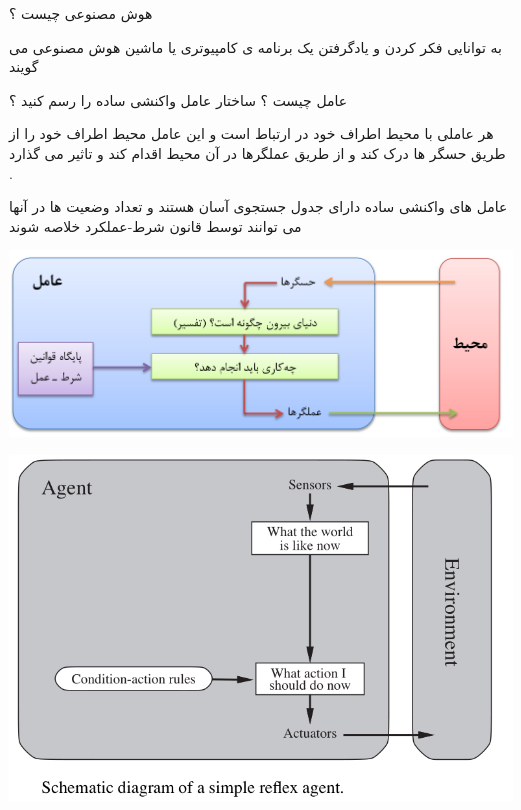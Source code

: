 \documentclass[12pt]{article}
\begin{document}
\noindent
هوش مصنوعی
 چیست ؟

\vspace{10pt}


\begin{tcolorbox}
به توانایی فکر کردن و یادگرفتن یک برنامه ی کامپیوتری یا ماشین  هوش مصنوعی می گویند 
\end{tcolorbox}

\vspace{30pt}

\noindent
عامل
 چیست ؟ ساختار عامل واکنشی ساده را رسم کنید ؟

\vspace{10pt}

\begin{tcolorbox}
هر عاملی با محیط اطراف خود در ارتباط است و این عامل محیط  اطراف خود را از طریق حسگر ها درک کند و از طریق عملگرها در آن محیط اقدام کند و تاثیر می گذارد .
\end{tcolorbox}


\begin{tcolorbox}
عامل های واکنشی ساده دارای جدول جستجوی آسان هستند و تعداد وضعیت ها در آنها می توانند توسط قانون شرط-عملکرد خلاصه شوند 
\end{tcolorbox}

\begin{center}
	\includegraphics[scale=0.6]{./Untitled.png}
\end{center}

\begin{center}
	\includegraphics[scale=0.6]{./simple_reflex_agent.png}
\end{center}
\end{document}
